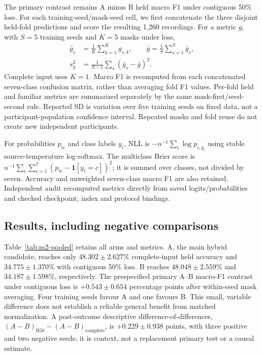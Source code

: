 


The primary contrast remains A minus B held macro F1 under contiguous
50\% loss. For each training-seed/mask-seed cell, we first concatenate the
three disjoint held-fold predictions and score the resulting 1,260 recordings.
For a metric $g$, with $S=5$ training seeds and $K=5$ masks under loss,
\begin{equation}
 \begin{aligned}
 \bar g_s&=\frac1K\sum_{k=1}^{K}g_{s,k},\qquad
 \bar g=\frac1S\sum_{s=1}^{S}\bar g_s,\\
 s_g^2&=\frac1{S-1}\sum_s(\bar g_s-\bar g)^2.
 \end{aligned}
 \label{eq:m2-summary}
\end{equation}
Complete input uses $K=1$. Macro F1 is recomputed from each concatenated
seven-class confusion matrix, rather than averaging fold F1 values.
Per-fold held and familiar metrics are summarized separately by the same
mask-first/seed-second rule. Reported SD is variation over five training seeds
on fixed data, not a participant-population confidence interval. Repeated
masks and fold reuse do not create new independent participants.

For probabilities $p_{ic}$ and class labels $y_i$, NLL is
$-n^{-1}\sum_i\log p_{i,y_i}$ using stable source-temperature log-softmax.
The multiclass Brier score is
$n^{-1}\sum_i\sum_{c=1}^{7}(p_{ic}-\mathbf1[y_i=c])^2$; it is summed over
classes, not divided by seven. Accuracy and unweighted seven-class macro F1
are also retained. Independent audit recomputed metrics directly from saved
logits/probabilities and checked checkpoint, index and protocol bindings.

\subsection*{Results, including negative comparisons}
Table~\ref{tab:m2-pooled} retains all arms and metrics.
A, the main hybrid candidate, reaches only $48.302\pm2.627$\% complete-input
held accuracy and $34.775\pm1.370$\% with contiguous 50\% loss.
B reaches $48.048\pm2.559$\% and $34.187\pm1.598$\%, respectively.
The prespecified primary A--B macro-F1 contrast under contiguous loss is
$+0.543\pm0.654$ percentage points after within-seed mask averaging.
Four training seeds favour A and one favours B. This small, variable difference
does not establish a reliable general benefit from matched normalization.
A post-outcome descriptive difference-of-differences,
$(A-B)_{\mathrm{B50}}-(A-B)_{\mathrm{complete}}$, is
$+0.229\pm0.938$ points, with three positive and two negative seeds; it is
context, not a replacement primary test or a causal estimate.

